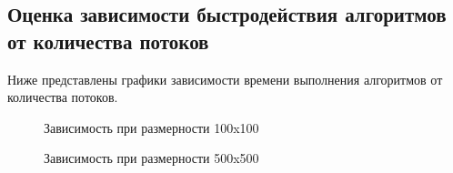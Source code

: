 \documentclass[a4paper,12pt]{article}
\begin{document}
\subsection{Оценка зависимости быстродействия алгоритмов от количества потоков}
Ниже представлены графики зависимости времени выполнения алгоритмов от количества потоков.
\begin{figure}[H]
\caption{Зависимость при размерности 100x100}
\label{graphics:graphic1}
\end{figure}
\begin{figure}[H]
\caption{Зависимость при размерности 500x500}
\label{graphics:graphic1}
\end{figure}
\end{document}
